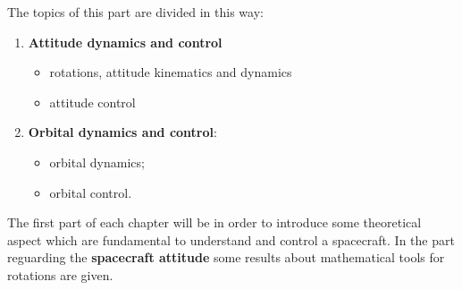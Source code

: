 The topics of this part are divided in this way: 
\begin{enumerate}
    \itemsep0em
    \item \textbf{Attitude dynamics and control}
    \begin{itemize}
        \itemsep0em
        \item rotations, attitude kinematics and dynamics
        \item attitude control
    \end{itemize}
    \item \textbf{Orbital dynamics and control}: 
    \begin{itemize}
        \itemsep0em
        \item orbital dynamics; 
        \item orbital control.
    \end{itemize}
\end{enumerate}

The first part of each chapter will be in order to introduce some theoretical aspect which are fundamental to understand and control a spacecraft. In the part reguarding the \textbf{spacecraft attitude} some results about mathematical tools for rotations are given.

